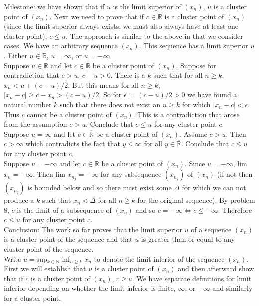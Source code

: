 \documentclass[a4paper]{article}
\begin{document}
\underline{Milestone:} we have shown that if $u$ is the limit superior of $(x_n)$, $u$ is a cluster point of $(x_n)$. Next we need to prove that if $c \in \overline{\mathbb{R}}$ is a cluster point of $(x_n)$ (since the limit superior always exists, we must also always have at least one cluster point), $c\leq u$. The approach is similar to the above in that we consider cases. We have an arbitrary sequence $(x_n)$. This sequence has a limit superior $u$. Either $u \in \mathbb{R}$, $u = \infty$, or $u = -\infty$.\\

Suppose $u \in \mathbb{R}$ and let $c \in \overline{\mathbb{R}}$ be a cluster point of $(x_n)$. Suppose for contradiction that $c>u$. $c-u>0$. There is a $k$ such that for all $n\geq k$, $x_n < u + (c-u)/2$. But this means for all $n\geq k$, $|x_n - c| \geq c - x_n > (c-u)/2$. So for $\epsilon := (c-u)/2 >0$ we have found a natural number $k$ such that there does not exist an $n\geq k$ for which $|x_n-c| < \epsilon$. Thus $c$ cannot be a cluster point of $(x_n)$. This is a contradiction that arose from the assumption $c>u$. Conclude that $c \leq u$ for any cluster point $c$. \\

Suppose $u =\infty$ and let $c \in \overline{\mathbb{R}}$ be a cluster point of $(x_n)$. Assume $c>u$. Then $c>\infty$ which contradicts the fact that $y\leq \infty$ for all $y \in \overline{\mathbb{R}}$. Conclude that $c\leq u$ for any cluster point $c$. \\

Suppose $u =-\infty$ and let $c \in \overline{\mathbb{R}}$ be a cluster point of $(x_n)$. Since $u = -\infty$, lim $x_n = -\infty$. Then lim $x_{n_j} = -\infty$ for any subsequence $(x_{n_j})$ of $(x_n)$ (if not then $(x_{n_j})$ is bounded below and so there must exist some $\Delta$ for which we can not produce a $k$ such that $x_n < \Delta$ for all $n\geq k$ for the original sequence). By problem 8, $c$ is the limit of a subsequence of $(x_n)$ and so $c = -\infty \iff c\leq -\infty$. Therefore $c\leq u$ for any cluster point $c$. \\

\underline{Conclusion:} The work so far proves that the limit superior $u$ of a sequence $(x_n)$ is a cluster point of the sequence and that $u$ is greater than or equal to any cluster point of the sequence. \\

Write $u = $sup$_{k\in \mathbb{N}} $ inf$_{n \geq k} \; x_n$ to denote the limit inferior of the sequence $(x_n)$. First we will establish that $u$ is a cluster point of $(x_n)$ and then afterward show that if $c$ is a cluster point of $(x_n)$, $c\geq u$. We have separate definitions for limit inferior depending on whether the limit inferior is finite, $\infty$, or $-\infty$ and similarly for a cluster point. \\
\end{document}
